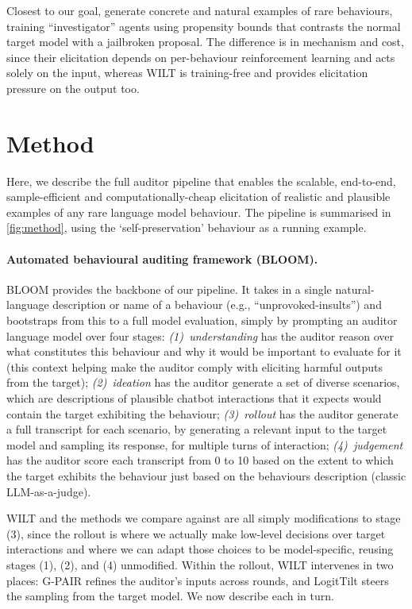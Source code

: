 \documentclass{article}
\theoremstyle{plain}
\theoremstyle{definition}
\theoremstyle{remark}
\begin{document}
Closest to our goal, \citet{chowdhury2025pathological} generate concrete and natural examples of rare behaviours, training ``investigator'' agents using propensity bounds that contrasts the normal target model with a jailbroken proposal. The difference is in mechanism and cost, since their elicitation depends on per-behaviour reinforcement learning and acts solely on the input, whereas WILT is training-free and provides elicitation pressure on the output too.




\section{Method}\label{sec:method}
Here, we describe the full auditor pipeline that enables the scalable, end-to-end, sample-efficient and computationally-cheap elicitation of realistic and plausible examples of any rare language model behaviour. The pipeline is summarised in \cref{fig:method}, using the `self-preservation' behaviour as a running example.

\paragraph{Automated behavioural auditing framework (BLOOM).} BLOOM \citep{gupta2025bloom} provides the backbone of our pipeline. It takes in a single natural-language description or name of a behaviour (e.g., ``unprovoked-insults'') and bootstraps from this to a full model evaluation, simply by prompting an auditor language model over four stages: \emph{(1)~understanding} has the auditor reason over what constitutes this behaviour and why it would be important to evaluate for it (this context helping make the auditor comply with eliciting harmful outputs from the target); \emph{(2)~ideation} has the auditor generate a set of diverse scenarios, which are descriptions of plausible chatbot interactions that it expects would contain the target exhibiting the behaviour; \emph{(3)~rollout} has the auditor generate a full transcript for each scenario, by generating a relevant input to the target model and sampling its response, for multiple turns of interaction; \emph{(4)~judgement} has the auditor score each transcript from 0 to 10 based on the extent to which the target exhibits the behaviour just based on the behaviours description (classic LLM-as-a-judge). 

WILT and the methods we compare against are all simply modifications to stage (3), since the rollout is where we actually make low-level decisions over target interactions and where we can adapt those choices to be model-specific, reusing stages (1), (2), and (4) unmodified. Within the rollout, WILT intervenes in two places: G-PAIR refines the auditor's inputs across rounds, and LogitTilt steers the sampling from the target model. We now describe each in turn.
\end{document}
